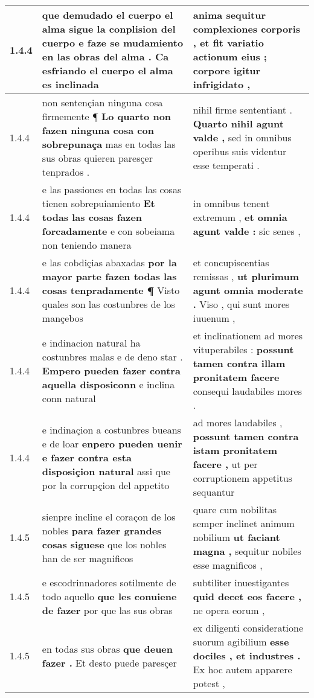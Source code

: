 \begin{tabular}{|p{1cm}|p{6.5cm}|p{6.5cm}|}
1.4.4 & que demudado el cuerpo el alma sigue la conplision del cuerpo \textbf{ e faze se mudamiento en las obras del alma . } Ca esfriando el cuerpo el alma es inclinada & anima sequitur complexiones corporis , \textbf{ et fit variatio actionum eius ; } corpore igitur infrigidato , \\\hline
1.4.4 & non sentençian ninguna cosa firmemente ¶ \textbf{ Lo quarto non fazen ninguna cosa con sobrepunaça } mas en todas las sus obras quieren paresçer tenprados . & nihil firme sententiant . \textbf{ Quarto nihil agunt valde , } sed in omnibus operibus suis videntur esse temperati . \\\hline
1.4.4 & e las passiones en todas las cosas tienen sobrepuiamiento \textbf{ Et todas las cosas fazen forcadamente } e con sobeiama non teniendo manera & in omnibus tenent extremum , \textbf{ et omnia agunt valde : } sic senes , \\\hline
1.4.4 & e las cobdiçias abaxadas \textbf{ por la mayor parte fazen todas las cosas tenpradamente ¶ } Visto quales son las costunbres de los mançebos & et concupiscentias remissas , \textbf{ ut plurimum agunt omnia moderate . } Viso , qui sunt mores iuuenum , \\\hline
1.4.4 & e indinacion natural ha costunbres malas e de deno star . \textbf{ Empero pueden fazer contra aquella disposiconn } e inclina conn natural & et inclinationem ad mores vituperabiles : \textbf{ possunt tamen contra illam pronitatem facere } consequi laudabiles mores . \\\hline
1.4.4 & e indinaçion a costunbres bueans e de loar \textbf{ enpero pueden uenir e fazer contra esta disposiçion natural } assi que por la corrupçion del appetito & ad mores laudabiles , \textbf{ possunt tamen contra istam pronitatem facere , } ut per corruptionem appetitus sequantur \\\hline
1.4.5 & sienpre incline el coraçon de los nobles \textbf{ para fazer grandes cosas siguese } que los nobles han de ser magnificos & quare cum nobilitas semper inclinet animum nobilium \textbf{ ut faciant magna , } sequitur nobiles esse magnificos , \\\hline
1.4.5 & e escodrinnadores sotilmente de todo aquello \textbf{ que les conuiene de fazer } por que las sus obras & subtiliter inuestigantes \textbf{ quid decet eos facere , } ne opera eorum , \\\hline
1.4.5 & en todas sus obras \textbf{ que deuen fazer . } Et desto puede paresçer & ex diligenti consideratione suorum agibilium \textbf{ esse dociles , et industres . } Ex hoc autem apparere potest , \\\hline

\end{tabular}
